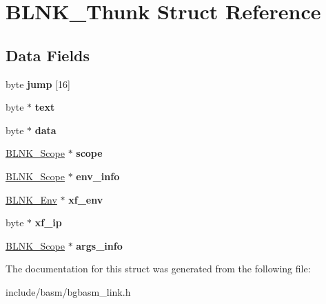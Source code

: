 \hypertarget{structBLNK__Thunk}{\section{B\-L\-N\-K\-\_\-\-Thunk Struct Reference}
\label{structBLNK__Thunk}
}
\subsection*{Data Fields}
\begin{DoxyCompactItemize}
\item 
\hypertarget{structBLNK__Thunk_a8ee057556888f2c235b1862d172a4ae0}{byte {\bfseries jump} \mbox{[}16\mbox{]}}\label{structBLNK__Thunk_a8ee057556888f2c235b1862d172a4ae0}

\item 
\hypertarget{structBLNK__Thunk_ac9ff75aa5da122b2144d4ab924b45773}{byte $\ast$ {\bfseries text}}\label{structBLNK__Thunk_ac9ff75aa5da122b2144d4ab924b45773}

\item 
\hypertarget{structBLNK__Thunk_acc26abe833b2370d8067547cf7f3e43d}{byte $\ast$ {\bfseries data}}\label{structBLNK__Thunk_acc26abe833b2370d8067547cf7f3e43d}

\item 
\hypertarget{structBLNK__Thunk_a6e0014107d52151862d6650b07daed22}{\hyperlink{structBLNK__Scope__s}{B\-L\-N\-K\-\_\-\-Scope} $\ast$ {\bfseries scope}}\label{structBLNK__Thunk_a6e0014107d52151862d6650b07daed22}

\item 
\hypertarget{structBLNK__Thunk_a5d61c44c15692d7529099e5e289a54e4}{\hyperlink{structBLNK__Scope__s}{B\-L\-N\-K\-\_\-\-Scope} $\ast$ {\bfseries env\-\_\-info}}\label{structBLNK__Thunk_a5d61c44c15692d7529099e5e289a54e4}

\item 
\hypertarget{structBLNK__Thunk_acad9f590d5e2c92be9b92d815da0e65e}{\hyperlink{structBLNK__Env__s}{B\-L\-N\-K\-\_\-\-Env} $\ast$ {\bfseries xf\-\_\-env}}\label{structBLNK__Thunk_acad9f590d5e2c92be9b92d815da0e65e}

\item 
\hypertarget{structBLNK__Thunk_a6249e7f18715cb777905fcf83b6b4130}{byte $\ast$ {\bfseries xf\-\_\-ip}}\label{structBLNK__Thunk_a6249e7f18715cb777905fcf83b6b4130}

\item 
\hypertarget{structBLNK__Thunk_a5af60190ab2cd6dd0742433b008c5aa6}{\hyperlink{structBLNK__Scope__s}{B\-L\-N\-K\-\_\-\-Scope} $\ast$ {\bfseries args\-\_\-info}}\label{structBLNK__Thunk_a5af60190ab2cd6dd0742433b008c5aa6}

\end{DoxyCompactItemize}


The documentation for this struct was generated from the following file\-:\begin{DoxyCompactItemize}
\item 
include/basm/bgbasm\-\_\-link.\-h\end{DoxyCompactItemize}
